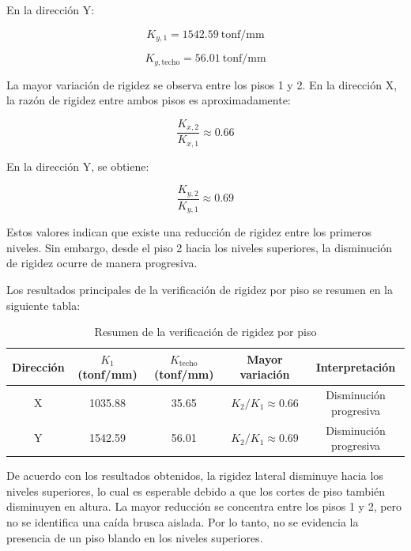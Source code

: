 En la dirección Y:

\begin{equation}
K_{y,1} = 1542.59 \ \text{tonf/mm}
\end{equation}

\begin{equation}
K_{y,\text{techo}} = 56.01 \ \text{tonf/mm}
\end{equation}

La mayor variación de rigidez se observa entre los pisos 1 y 2. En la dirección X, la razón de rigidez entre ambos pisos es aproximadamente:

\begin{equation}
\frac{K_{x,2}}{K_{x,1}} \approx 0.66
\end{equation}

En la dirección Y, se obtiene:

\begin{equation}
\frac{K_{y,2}}{K_{y,1}} \approx 0.69
\end{equation}

Estos valores indican que existe una reducción de rigidez entre los primeros niveles. Sin embargo, desde el piso 2 hacia los niveles superiores, la disminución de rigidez ocurre de manera progresiva.

Los resultados principales de la verificación de rigidez por piso se resumen en la siguiente tabla:

\begin{table}[H]
\centering
\caption{Resumen de la verificación de rigidez por piso}
\begin{tabular}{ccccc}
\hline
Dirección & $K_1$ (tonf/mm) & $K_{\text{techo}}$ (tonf/mm) & Mayor variación & Interpretación \\
\hline
X & 1035.88 & 35.65 & $K_{2}/K_{1} \approx 0.66$ & Disminución progresiva \\
Y & 1542.59 & 56.01 & $K_{2}/K_{1} \approx 0.69$ & Disminución progresiva \\
\hline
\end{tabular}
\end{table}

De acuerdo con los resultados obtenidos, la rigidez lateral disminuye hacia los niveles superiores, lo cual es esperable debido a que los cortes de piso también disminuyen en altura. La mayor reducción se concentra entre los pisos 1 y 2, pero no se identifica una caída brusca aislada. Por lo tanto, no se evidencia la presencia de un piso blando en los niveles superiores.

